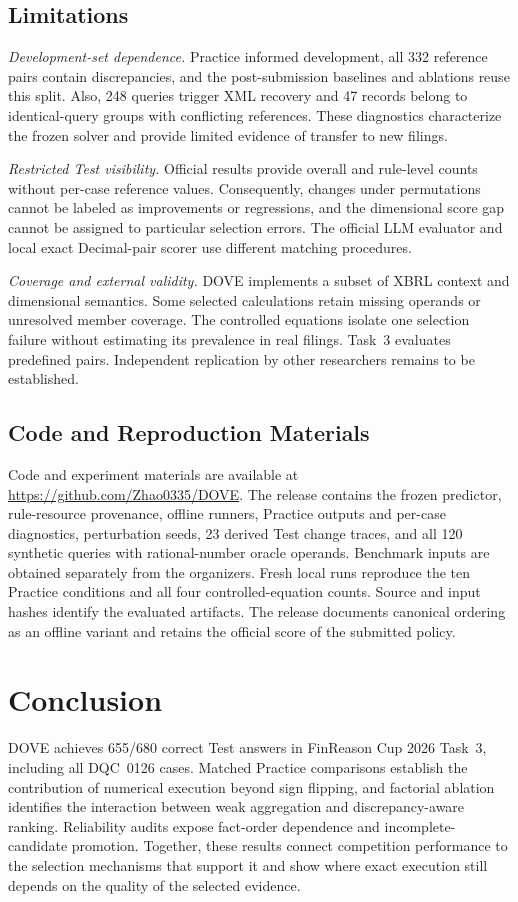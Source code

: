 \documentclass[conference]{IEEEtran}
\begin{document}
\subsection{Limitations}
\textit{Development-set dependence.} Practice informed development, all 332 reference pairs contain discrepancies, and the post-submission baselines and ablations reuse this split. Also, 248 queries trigger XML recovery and 47 records belong to identical-query groups with conflicting references. These diagnostics characterize the frozen solver and provide limited evidence of transfer to new filings.

\textit{Restricted Test visibility.} Official results provide overall and rule-level counts without per-case reference values. Consequently, changes under permutations cannot be labeled as improvements or regressions, and the dimensional score gap cannot be assigned to particular selection errors. The official LLM evaluator and local exact Decimal-pair scorer use different matching procedures.

\textit{Coverage and external validity.} DOVE implements a subset of XBRL context and dimensional semantics. Some selected calculations retain missing operands or unresolved member coverage. The controlled equations isolate one selection failure without estimating its prevalence in real filings. Task~3 evaluates predefined pairs. Independent replication by other researchers remains to be established.

\subsection{Code and Reproduction Materials}
\label{sec:release}
Code and experiment materials are available at \url{https://github.com/Zhao0335/DOVE}. The release contains the frozen predictor, rule-resource provenance, offline runners, Practice outputs and per-case diagnostics, perturbation seeds, 23 derived Test change traces, and all 120 synthetic queries with rational-number oracle operands. Benchmark inputs are obtained separately from the organizers. Fresh local runs reproduce the ten Practice conditions and all four controlled-equation counts. Source and input hashes identify the evaluated artifacts. The release documents canonical ordering as an offline variant and retains the official score of the submitted policy.

\section{Conclusion}
DOVE achieves 655/680 correct Test answers in FinReason Cup 2026 Task~3, including all DQC~0126 cases. Matched Practice comparisons establish the contribution of numerical execution beyond sign flipping, and factorial ablation identifies the interaction between weak aggregation and discrepancy-aware ranking. Reliability audits expose fact-order dependence and incomplete-candidate promotion. Together, these results connect competition performance to the selection mechanisms that support it and show where exact execution still depends on the quality of the selected evidence.
\end{document}
